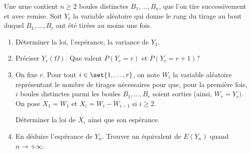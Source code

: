 \begin{enonce}
\begin{exercise}[ID={RMS127 E763},subtitle={Mines-Ponts PSI 2016},tags={}]
  Une urne contient $n\geq2$ boules distinctes $B_1,\dots,B_n$, que l'on tire successivement et avec remise.
  Soit $Y_r$ la variable aléatoire qui donne le rang du tirage au bout duquel $B_1,\dots,B_r$ ont été tirées au moins une fois.
  \begin{enumerate}
    \item Déterminer la loi, l'espérance, la variance de $Y_1$.

    \item Préciser $Y_r(\Omega)$.
      Que valent $P\left( Y_r = r \right)$ et $P\left( Y_r = r+1 \right)$?

    \item On fixe $r$.
      Pour tout $i\in\set{1,\dots,r}$, on note $W_i$ la variable aléatoire représentant le nombre de tirages nécessaires pour que, pour la première fois, $i$ boules distinctes parmi les boules $B_1,\dots,B_r$ soient sorties (ainsi, $W_r=Y_r)$.
      On pose $X_1=W_1$ et $X_i=W_i - W_{i-1}$ si $i\geq 2$.

      Déterminer la loi de $X_i$ ainsi que son espérance.

    \item En déduire l'espérance de $Y_n$.
      Trouver un équivalent de $E\left( Y_n \right)$ quand $n\to+\infty$.
  \end{enumerate}
\end{exercise}
\begin{solution}
\end{solution}
\end{enonce}
